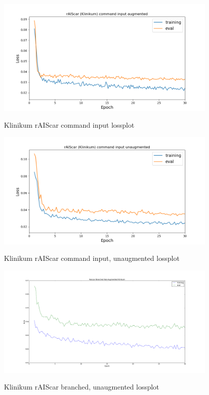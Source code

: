 \documentclass[a4paper]{article}
\begin{document}
\begin{figure}[!htbp]
  \centering
  \includegraphics[width=0.95\textwidth]{figures/klinikum_command_input_aug_lossplot}
  \label{fig:klinikum_augmented_command_loss}
  \caption{Klinikum rAIScar command input lossplot}
\end{figure}
\begin{figure}[!htbp]
  \centering
  \includegraphics[width=0.95\textwidth]{figures/klinikum_command_input_nonaug_lossplot}
  \label{fig:klinikum_unaugmented_command_loss}
  \caption{Klinikum rAIScar command input, unaugmented lossplot}
\end{figure}
\begin{figure}[H]
\centering
\includegraphics[width=0.95\textwidth]{figures/raiscar_branched_non_aug_klinikum_lossplot}
\label{fig:klinikum_unaugmented_branched_loss}
\caption{Klinikum rAIScar branched, unaugmented lossplot}
\end{figure}
\end{document}
